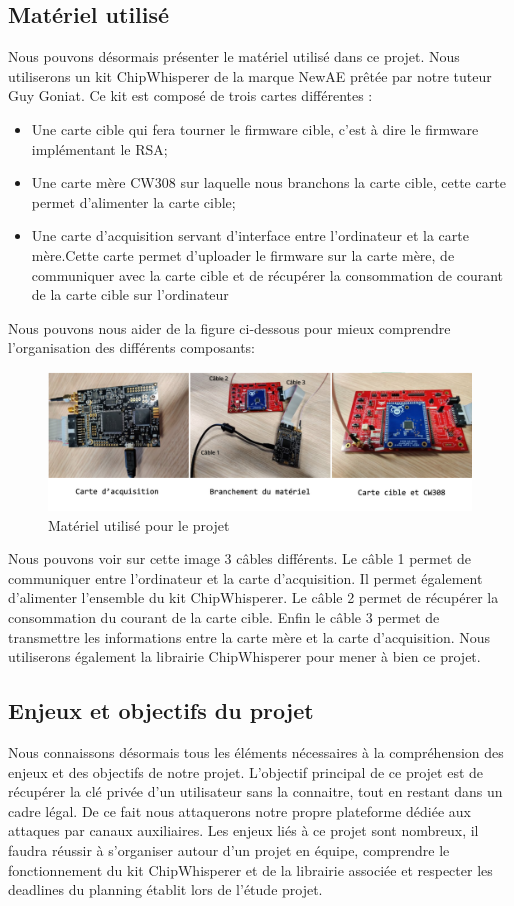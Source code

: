 \subsection{Matériel utilisé}
Nous pouvons désormais présenter le matériel utilisé dans ce projet. Nous utiliserons un kit ChipWhisperer de la marque NewAE prêtée par notre tuteur Guy Goniat. Ce kit est composé de trois cartes différentes :
\begin{itemize}
\item Une carte cible qui fera tourner le firmware cible, c'est à dire le firmware implémentant le RSA;
\item Une carte mère CW308 sur laquelle nous branchons la carte cible, cette carte permet d'alimenter la carte cible;
\item Une carte d’acquisition servant d'interface entre l'ordinateur et la carte mère.Cette carte permet d'uploader le firmware sur la carte mère, de communiquer avec la carte cible et de récupérer la consommation de courant de la carte cible sur l'ordinateur
\end{itemize}

Nous pouvons nous aider de la figure ci-dessous pour mieux comprendre l’organisation des différents composants:
\begin{figure}[H]
    \centering
    \includegraphics[width=\textwidth]{fig/materiel.png}
    \caption{Matériel utilisé pour le projet}
    \label{fig:materiel}
\end{figure}

Nous pouvons voir sur cette image 3 câbles différents. Le câble 1 permet de communiquer entre l’ordinateur et la carte d’acquisition. Il permet également d'alimenter l'ensemble du kit ChipWhisperer. Le câble 2 permet de récupérer la consommation du courant de la carte cible. Enfin le câble 3 permet de transmettre les informations entre la carte mère et la carte d’acquisition.
Nous utiliserons également la librairie ChipWhisperer pour mener à bien ce projet.
\newpage
\subsection{Enjeux et objectifs du projet}
Nous connaissons désormais tous les éléments nécessaires à la compréhension des enjeux et des objectifs de notre projet. L'objectif principal de ce projet est de récupérer la clé privée d'un utilisateur sans la connaitre, tout en restant dans un cadre légal. De ce fait nous attaquerons notre propre plateforme dédiée aux attaques par canaux auxiliaires. Les enjeux liés à ce projet sont nombreux, il faudra réussir à s’organiser autour d'un projet en équipe, comprendre le fonctionnement du kit ChipWhisperer et de la librairie associée et respecter les deadlines du planning établit lors de l'étude projet.

